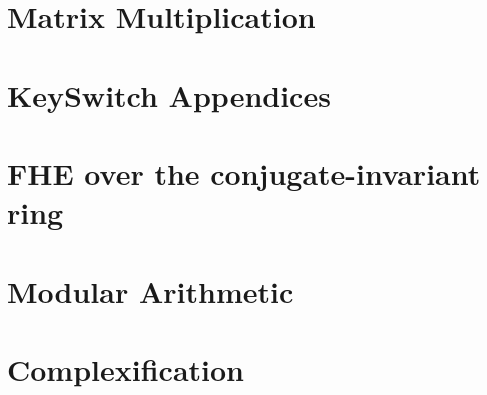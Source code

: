 \documentclass[oneside]{book}
\begin{document}
    \chapter{Matrix Multiplication}
    
	
	\printbibliography 
	
	\appendix
	\renewcommand{\thechapter}{\Alph{chapter}}
	\chapter{KeySwitch Appendices}
	

    \chapter{FHE over the conjugate-invariant ring}
    

    \chapter{Modular Arithmetic}
    
    
    \chapter{Complexification}
    
\end{document}
